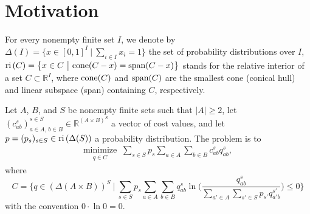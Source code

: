 \documentclass[smallextended,referee,envcountsect,]{svjour3}
\newcommand{\reli}{\ensuremath{\text{\rm ri}\,}}
\newcommand{\R}{{\mathbb R}}
\newcommand{\minimize}[2]{\ensuremath{\underset{\substack{{#1}}}%
{\mathrm{minimize}}\;\;#2 }}
\newcommand{\Menge}[2]{\bigg\{{#1}~\bigg|~{#2}\bigg\}}
\newcommand{\menge}[2]{\big\{{#1}~\big |~{#2}\big\}}
\begin{document}
\section{Motivation}\label{sec:motivation}
 For every nonempty finite 
set $I$, we denote by 
$\Delta(I)=\menge{x\in[0,1]^{{I}}}{\sum_{i\in 
I}x_i=1}$ the set of probability distributions over $I$, 
{$\reli(C)=\menge{x\in C}{{\rm cone}(C-x)={\rm 
span}(C-x)}$ stands 
for the relative interior of a set $C\subset \R^I$, where ${\rm 
cone}(C)$ and ${\rm span}(C)$ are the smallest cone (conical 
hull) and linear subspace (span) containing $C$, 
respectively.}
\begin{problem}\label{prob:main}
Let $A$, $B$, and $S$ be nonempty finite sets such that $|A|\ge 
2$, let $(c_{ab}^s)_{a\in A,\, b\in B}^{s\in S}\in \R^{(A\times 
B)^S}$ a vector of cost values, and let $p=(p_s)_{s\in 
S}\in{\reli(\Delta(S))}$ a probability distribution. 
The problem is to
\begin{align}
\label{e:PrimalProblem}
\minimize{q\in C}{\sum_{s\in 
S}p_s\sum_{a\in A}\sum_{b\in B}c_{ab}^sq_{ab}^s},
\end{align}
where 
\begin{equation}
\label{e:defC}
C=\Menge{q\in(\Delta(A\times 
B))^S}{\sum_{s\in 
S}p_s\sum_{a\in A}\sum_{b\in B}q_{ab}^s\ln 
\Bigg(\frac{q_{ab}^s}{\sum\limits_{a'\in A}\sum\limits_{s'\in 
S}p_{s'}q_{a'b}^{s'}}\Bigg)\leq 
0}
\end{equation}
with the convention $0\cdot\ln 0=0$.
\end{problem}
\end{document}
